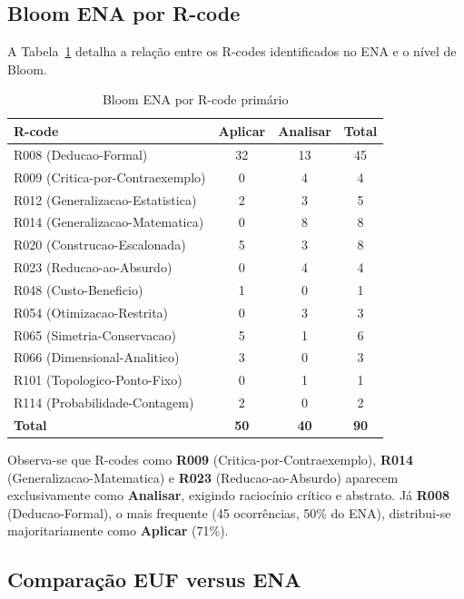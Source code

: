 \documentclass[12pt,a4paper]{article}
\newcommand{\rcode}[1]{\textcolor{azulprof}{\textbf{#1}}}
\newcommand{\bloom}[1]{\textcolor{verdeexame}{\textbf{#1}}}
\begin{document}
\subsection{Bloom ENA por R-code}

A Tabela~\ref{tab:bloom_ena_rcode} detalha a relação entre os R-codes
identificados no ENA e o nível de Bloom.

\begin{table}[H]
\centering
\caption{Bloom ENA por R-code primário}
\label{tab:bloom_ena_rcode}
\begin{tabular}{lccc}
\toprule
\textbf{R-code} & \textbf{Aplicar} & \textbf{Analisar} & \textbf{Total} \\
\midrule
R008 (Deducao-Formal) & 32 & 13 & 45 \\
R009 (Critica-por-Contraexemplo) & 0 & 4 & 4 \\
R012 (Generalizacao-Estatistica) & 2 & 3 & 5 \\
R014 (Generalizacao-Matematica) & 0 & 8 & 8 \\
R020 (Construcao-Escalonada) & 5 & 3 & 8 \\
R023 (Reducao-ao-Absurdo) & 0 & 4 & 4 \\
R048 (Custo-Beneficio) & 1 & 0 & 1 \\
R054 (Otimizacao-Restrita) & 0 & 3 & 3 \\
R065 (Simetria-Conservacao) & 5 & 1 & 6 \\
R066 (Dimensional-Analitico) & 3 & 0 & 3 \\
R101 (Topologico-Ponto-Fixo) & 0 & 1 & 1 \\
R114 (Probabilidade-Contagem) & 2 & 0 & 2 \\
\midrule
\textbf{Total} & \textbf{50} & \textbf{40} & \textbf{90} \\
\bottomrule
\end{tabular}
\end{table}

Observa-se que R-codes como \rcode{R009} (Critica-por-Contraexemplo),
\rcode{R014} (Generalizacao-Matematica) e \rcode{R023}
(Reducao-ao-Absurdo) aparecem exclusivamente como \bloom{Analisar},
exigindo raciocínio crítico e abstrato. Já \rcode{R008}
(Deducao-Formal), o mais frequente (45 ocorrências, 50\% do ENA),
distribui-se majoritariamente como \bloom{Aplicar} (71\%).

\subsection{Comparação EUF versus ENA}
\end{document}
